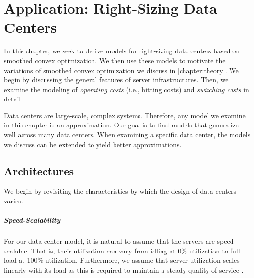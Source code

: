 
\chapter{Application: Right-Sizing Data Centers}\label{chapter:application}

In this chapter, we seek to derive models for right-sizing data centers based on smoothed convex optimization. We then use these models to motivate the variations of smoothed convex optimization we discuss in \autoref{chapter:theory}. We begin by discussing the general features of server infrastructures. Then, we examine the modeling of \emph{operating costs} (i.e., hitting costs) and \emph{switching costs} in detail.

Data centers are large-scale, complex systems. Therefore, any model we examine in this chapter is an approximation. Our goal is to find models that generalize well across many data centers. When examining a specific data center, the models we discuss can be extended to yield better approximations.

\section{Architectures}\label{section:application:architectures}

We begin by revisiting the characteristics by which the design of data centers varies.

\paragraph{Speed-Scalability} For our data center model, it is natural to assume that the servers are speed scalable. That is, their utilization can vary from idling at 0\% utilization to full load at 100\% utilization. Furthermore, we assume that server utilization scales linearly with its load as this is required to maintain a steady quality of service \cite{Bansal2015}.

